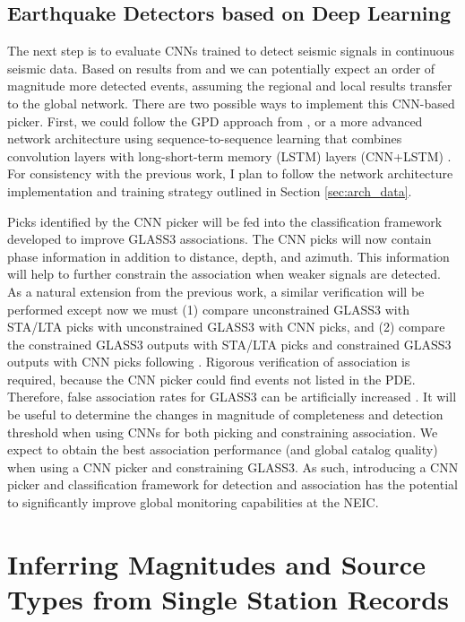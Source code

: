 \documentclass[12p]{article}
\begin{document}
\subsection{Earthquake Detectors based on Deep Learning}

The next step is to evaluate CNNs trained to detect seismic signals in continuous seismic data. Based on results from
\citet{Perol2018} and \citet{Ross2018b} we can potentially expect an order of magnitude more detected events, assuming
the regional and local results transfer to the global network. There are two possible ways to implement this CNN-based
picker. First, we could follow the GPD approach from \citet{Ross2018b}, or a more advanced network architecture using
sequence-to-sequence learning that combines convolution layers with long-short-term memory (LSTM) layers (CNN+LSTM)
\citep{Mousavi2019}. For consistency with the previous work, I plan to follow the network architecture implementation
and training strategy outlined in Section \ref{sec:arch_data}.

Picks identified by the CNN picker will be fed into the classification framework developed to improve GLASS3
associations. The CNN picks will now contain phase information in addition to distance, depth, and azimuth. This
information will help to further constrain the association when weaker signals are detected. As a natural extension from
the previous work, a similar verification will be performed except now we must (1) compare unconstrained GLASS3 with
STA/LTA picks with unconstrained GLASS3 with CNN picks, and (2) compare the constrained GLASS3 outputs with STA/LTA
picks and constrained GLASS3 outputs with CNN picks following \citet{Yeck2019}. Rigorous verification of association is
required, because the CNN picker could find events not listed in the PDE. Therefore, false association rates for GLASS3
can be artificially increased \citep{Yeck2019}. It will be useful to determine the changes in magnitude of completeness
and detection threshold when using CNNs for both picking and constraining association. We expect to obtain the best
association performance (and global catalog quality) when using a CNN picker and constraining GLASS3. As such,
introducing a CNN picker and classification framework for detection and association has the potential to significantly
improve global monitoring capabilities at the NEIC.

\section{Inferring Magnitudes and Source Types from Single Station Records}
\end{document}
